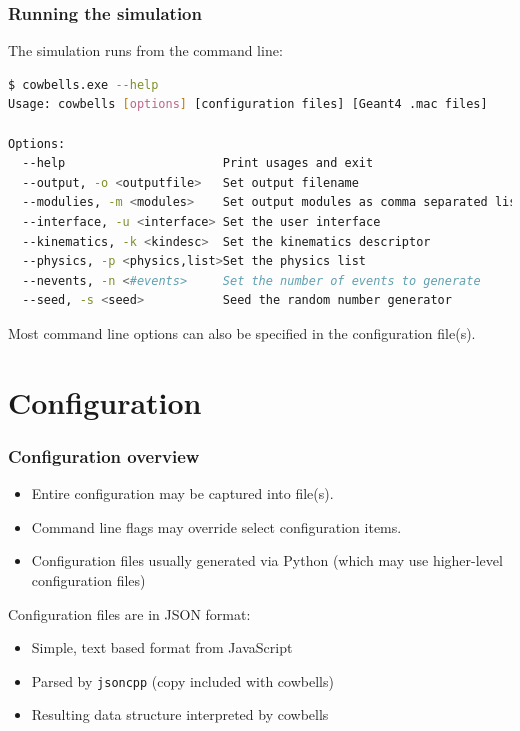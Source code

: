 \documentclass[xcolor=dvipsnames]{beamer}
\begin{document}
\begin{frame}[fragile]
  \frametitle{Running the simulation}

The simulation runs from the command line:

\begin{lstlisting}[language=sh]
$ cowbells.exe --help
Usage: cowbells [options] [configuration files] [Geant4 .mac files]

Options:
  --help                      Print usages and exit
  --output, -o <outputfile>   Set output filename
  --modulies, -m <modules>    Set output modules as comma separated list
  --interface, -u <interface> Set the user interface
  --kinematics, -k <kindesc>  Set the kinematics descriptor
  --physics, -p <physics,list>Set the physics list
  --nevents, -n <#events>     Set the number of events to generate
  --seed, -s <seed>           Seed the random number generator
\end{lstlisting}

Most command line options can also be specified in the configuration file(s).
\end{frame}

\section{Configuration}

\begin{frame}
  \frametitle{Configuration overview}
  \begin{itemize}
  \item Entire configuration may be captured into file(s).
  \item Command line flags may override select configuration items.
  \item Configuration files usually generated via Python (which may use higher-level configuration files)
  \end{itemize}

  Configuration files are in JSON format:
  \begin{itemize}
  \item Simple, text based format from JavaScript
  \item Parsed by \texttt{jsoncpp} (copy included with cowbells)
  \item Resulting data structure interpreted by cowbells
  \end{itemize}

\end{frame}
\end{document}
